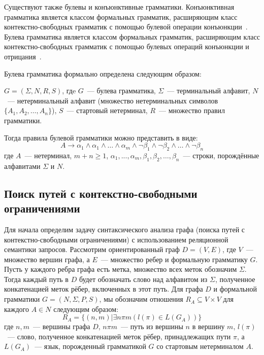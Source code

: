 Существуют также булевы и конъюнктивные грамматики. Конъюнктивная грамматика является классом формальных грамматик, расширяющим класс контекстно-свободных грамматик с помощью булевой операции конъюнкции~\cite{conjunctive}. Булева грамматика является классом формальных грамматик, расширяющим класс контекстно-свободных грамматик с помощью булевых операций конъюнкции и отрицания~\cite{boolean}.

Булева грамматика формально определена следующим образом:

$G = (\Sigma, N, R, S)$, гдe $G$~--- булева грамматика, $\Sigma$~--- терминальный алфавит, $N$~--- нетерминальный алфавит (множество
нетерминальных символов $\{A_1, A_2, … , A_n\}$), $S$~--- стартовый
нетерминал, $R$~--- множество правил грамматики.

Тогда правила булевой грамматики можно представить в виде:
\begin{equation}
A \rightarrow \alpha_1 \wedge  \alpha_1 \wedge … \wedge  \alpha_m \wedge \neg \beta_1 \wedge \neg \beta_2 \wedge … \wedge \neg \beta_n
\end{equation}
где $A$~--- нетерминал, $m + n \ge 1$, $\alpha_1, ..., \alpha_m , \beta_1,\beta_2, … , \beta_n$~--- строки, порождённые алфавитами $\Sigma$ и $N$.

\subsection{Поиск путей с контекстно-свободными ограничениями}
Для начала определим задачу синтаксического анализа графа (поиска путей с контекстно-свободными ограничениями) с
использованием реляционной семантики запросов.
Рассмотрим ориентированный граф $D = (V, E)$, где $V$~--- множество вершин графа, а $E$~--- множество ребер и
формальную грамматику $G$. Пусть у каждого ребра графа есть
метка, множество всех меток обозначим $\Sigma$. Тогда каждый путь в
$D$ будет обозначать слово над алфавитом из $\Sigma$, полученное
конкатенацией меток рёбер, включенных в этот путь.
Для графа $D$ и формальной грамматики $G = (N, \Sigma, P, S)$, мы
обозначим отношения $R_A \subseteq V\times V$ для каждого $A \in N$ следующим
образом:
\begin{equation}
R_A = \{(n, m) | \exists n\pi m(l(\pi) \in L(G_A)) \}
\end{equation}
где $n, m$~--- вершины графа $D$, $n\pi m$~--- путь из вершины $n$ в вершину $m$, $l(\pi)$~--- слово, полученное
конкатенацией меток рёбер, принадлежащих пути $\pi$, а $L(G_A)$~--- язык, порожденный грамматикой $G$ со стартовым нетерминалом $A$.

